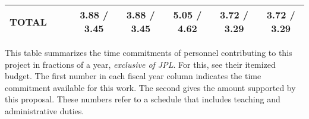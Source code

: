 \begin{table}[tbh]
\begin{center}
\begin{tabular}{lccccccc}




\\
TOTAL                      & &  &  3.88 / 3.45 &  3.88 / 3.45 &  5.05 / 4.62 &  3.72 / 3.29 &  3.72 / 3.29  \\
\hline
\end{tabular}
\end{center}
\end{table}

\vspace{0.5in}
\noindent
This table summarizes the time commitments of personnel contributing
to this project in fractions of a year, {\it exclusive of JPL}.  For this, see their itemized budget.  The
first number in each fiscal year column indicates the time commitment
available for this work.  The second gives the amount supported by
this proposal.  These numbers refer to a schedule that includes
teaching and administrative duties.

\newpage

